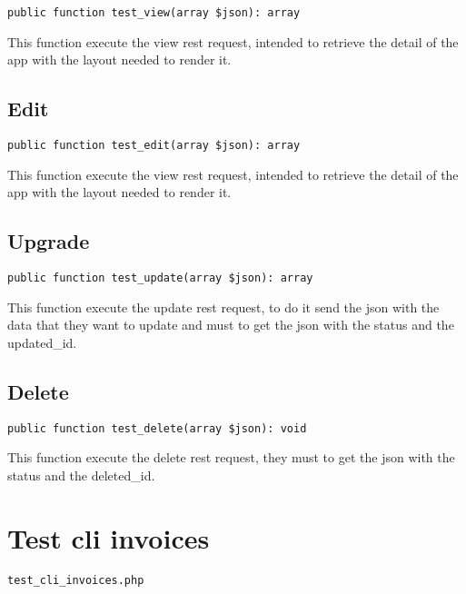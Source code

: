 \documentclass[a4paper]{book}
\begin{document}
\begin{lstlisting}
public function test_view(array $json): array
\end{lstlisting}

This function execute the view rest request, intended to retrieve the detail
of the app with the layout needed to render it.

\hypertarget{toc17}{}
\subsection{Edit}

\begin{lstlisting}
public function test_edit(array $json): array
\end{lstlisting}

This function execute the view rest request, intended to retrieve the detail
of the app with the layout needed to render it.

\hypertarget{toc18}{}
\subsection{Upgrade}

\begin{lstlisting}
public function test_update(array $json): array
\end{lstlisting}

This function execute the update rest request, to do it send the json with
the data that they want to update and must to get the json with the status
and the updated\_id.

\hypertarget{toc19}{}
\subsection{Delete}

\begin{lstlisting}
public function test_delete(array $json): void
\end{lstlisting}

This function execute the delete rest request, they must to get the json
with the status and the deleted\_id.

\hypertarget{toc20}{}
\section{Test cli invoices}

\begin{lstlisting}
test_cli_invoices.php
\end{lstlisting}
\end{document}
